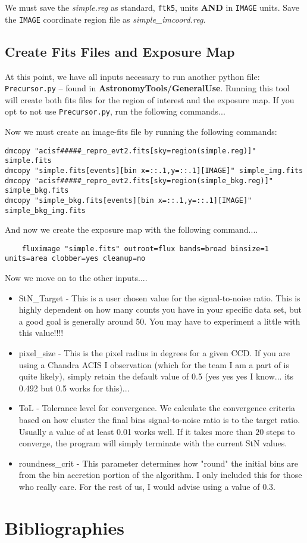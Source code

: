 \documentclass[11pt,letterpaper]{article}
\begin{document}
We must save the \textit{simple.reg} as standard, \texttt{ftk5}, units \textbf{AND} in \texttt{IMAGE} units. Save the \texttt{IMAGE} coordinate region file as \textit{simple\_imcoord.reg}.

\subsection{Create Fits Files and Exposure Map}

At this point, we have all inputs necessary to run another python file: \texttt{Precursor.py} -- found in \textbf{AstronomyTools/GeneralUse}. Running this tool will create both fits files for the region of interest and the exposure map. If you opt to not use \texttt{Precursor.py}, run the following commands...


Now we must create an image-fits file by running the following commands:
\begin{lstlisting}
dmcopy "acisf#####_repro_evt2.fits[sky=region(simple.reg)]" simple.fits
dmcopy "simple.fits[events][bin x=::.1,y=::.1][IMAGE]" simple_img.fits
dmcopy "acisf#####_repro_evt2.fits[sky=region(simple_bkg.reg)]" simple_bkg.fits
dmcopy "simple_bkg.fits[events][bin x=::.1,y=::.1][IMAGE]" simple_bkg_img.fits
\end{lstlisting}

And now we create the exposure map with the following command....

\begin{lstlisting}
	fluximage "simple.fits" outroot=flux bands=broad binsize=1 units=area clobber=yes cleanup=no
\end{lstlisting}

Now we move on to the other inputs....
\begin{itemize}
	\item StN\_Target - This is a user chosen value for the signal-to-noise ratio. This is highly dependent on how many counts you have in your specific data set, but a good goal is generally around 50. You may have to experiment a little with this value!!!!
	\item pixel\_size - This is the pixel radius in degrees for a given CCD. If you are using a Chandra ACIS I observation (which for the team I am a part of is quite likely), simply retain the default value of 0.5 (yes yes yes I know... its 0.492 but 0.5 works for this)...
	\item ToL - Tolerance level for convergence. We calculate the convergence criteria based on how cluster the final bins signal-to-noise ratio is to the target ratio. Usually a value of at least 0.01 works well. If it takes more than $20$ steps to converge, the program will simply terminate with the current StN values.
	\item roundness\_crit - This parameter determines how "round" the initial bins are from the bin accretion portion of the algorithm. I only included this for those who really care. For the rest of us, I would advise using a value of $0.3$.
\end{itemize}
\newpage



\newpage
\section*{Bibliographies}


\end{document}
